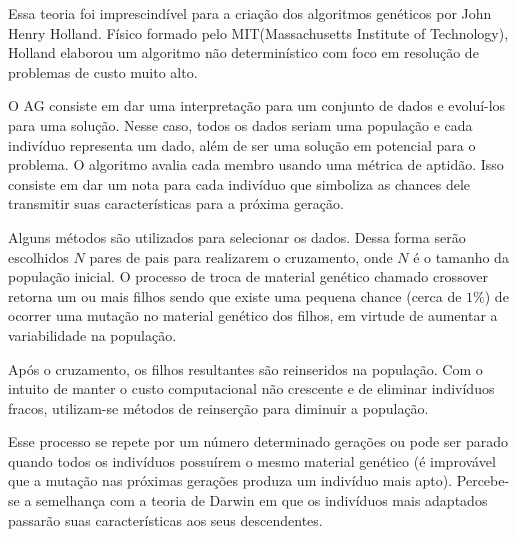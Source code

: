 \documentclass[]{article}
\begin{document}
	Essa teoria foi imprescindível para a criação dos algoritmos genéticos por John Henry Holland. Físico formado pelo MIT(Massachusetts Institute of Technology), Holland elaborou um algoritmo não determinístico com foco em resolução de problemas de custo muito alto.
	
	O AG consiste em dar uma interpretação para um conjunto de dados e evoluí-los para uma solução. Nesse caso, todos os dados seriam uma população e cada indivíduo representa um dado, além de ser uma solução em potencial para o problema. O algoritmo avalia cada membro usando uma métrica de aptidão. Isso consiste em dar um nota para cada indivíduo que simboliza as chances dele transmitir suas características para a próxima geração.
	
	Alguns métodos são utilizados para selecionar os dados. Dessa forma serão escolhidos $N$ pares de pais para realizarem o cruzamento, onde $N$ é o tamanho da população inicial. O processo de troca de material genético chamado crossover retorna um ou mais filhos sendo que existe uma pequena chance (cerca de $1\%$) de ocorrer uma mutação no material genético dos filhos, em virtude de aumentar a variabilidade na população.
	
	Após o cruzamento, os filhos resultantes são reinseridos na população. Com o intuito de manter o custo computacional não crescente e de eliminar indivíduos fracos, utilizam-se métodos de reinserção para diminuir a população.
	
	Esse processo se repete por um número determinado gerações ou pode ser parado quando todos os indivíduos possuírem o mesmo material genético (é improvável que a mutação nas próximas gerações produza um indivíduo mais apto). 
 	Percebe-se a semelhança com a teoria de Darwin em que os indivíduos mais adaptados passarão suas características aos seus descendentes.
	


\newpage


\end{document}
